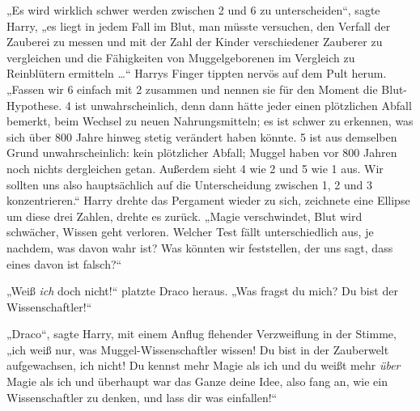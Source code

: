 „Es wird wirklich schwer werden zwischen 2 und 6 zu unterscheiden“, sagte Harry, „es liegt in jedem Fall im Blut, man müsste versuchen, den Verfall der Zauberei zu messen und mit der Zahl der Kinder verschiedener Zauberer zu vergleichen und die Fähigkeiten von Muggelgeborenen im Vergleich zu Reinblütern ermitteln …“ Harrys Finger tippten nervös auf dem Pult herum.
„Fassen wir 6 einfach mit 2 zusammen und nennen sie für den Moment die Blut-Hypothese. 4 ist unwahrscheinlich, denn dann hätte jeder einen plötzlichen Abfall bemerkt, beim Wechsel zu neuen Nahrungsmitteln; es ist schwer zu erkennen, was sich über 800 Jahre hinweg stetig verändert haben könnte. 5 ist aus demselben Grund unwahrscheinlich: kein plötzlicher Abfall; Muggel haben vor 800 Jahren noch nichts dergleichen getan. Außerdem sieht 4 wie 2 und 5 wie 1 aus. Wir sollten uns also hauptsächlich auf die Unterscheidung zwischen 1, 2 und 3 konzentrieren.“ Harry drehte das Pergament wieder zu sich, zeichnete eine Ellipse um diese drei Zahlen, drehte es zurück.
„Magie verschwindet, Blut wird schwächer, Wissen geht verloren. Welcher Test fällt unterschiedlich aus, je nachdem, was davon wahr ist? Was könnten wir feststellen, der uns sagt, dass eines davon ist falsch?“

„Weiß \emph{ich} doch nicht!“ platzte Draco heraus.
„Was fragst du mich? Du bist der Wissenschaftler!“

„Draco“, sagte Harry, mit einem Anflug flehender Verzweiflung in der Stimme, „ich weiß nur, was Muggel-Wissenschaftler wissen! Du bist in der Zauberwelt aufgewachsen, ich nicht! Du kennst mehr Magie als ich und du weißt mehr \emph{über} Magie als ich und überhaupt war das Ganze deine Idee, also fang an, wie ein Wissenschaftler zu denken, und lass dir was einfallen!“


